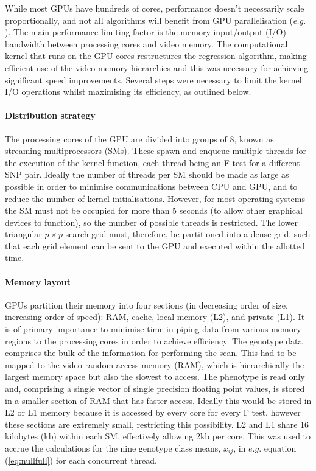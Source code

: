 While most GPUs have hundreds of cores, performance doesn't necessarily scale proportionally, and not all algorithms will benefit from GPU parallelisation (\emph{e.g.} \citealp{Davis2011}). The main performance limiting factor is the memory input/output (I/O) bandwidth between processing cores and video memory. The computational kernel that runs on the GPU cores restructures the regression algorithm, making efficient use of the video memory hierarchies and this was necessary for achieving significant speed improvements. Several steps were necessary to limit the kernel I/O operations whilst maximising its efficiency, as outlined below.

\paragraph{Distribution strategy} The processing cores of the GPU are divided into groups of 8, known as streaming multiprocessors (SMs). These spawn and enqueue multiple threads for the execution of the kernel function, each thread being an F test for a different SNP pair. Ideally the number of threads per SM should be made as large as possible in order to minimise communications between CPU and GPU, and to reduce the number of kernel initialisations. However, for most operating systems the SM must not be occupied for more than 5 seconds (to allow other graphical devices to function), so the number of possible threads is restricted. The lower triangular $p \times p$ search grid must, therefore, be partitioned into a dense grid, such that each grid element can be sent to the GPU and executed within the allotted time.

\paragraph{Memory layout} GPUs partition their memory into four sections (in decreasing order of size, increasing order of speed): RAM, cache, local memory (L2), and private (L1). It is of primary importance to minimise time in piping data from various memory regions to the processing cores in order to achieve efficiency. The genotype data comprises the bulk of the information for performing the scan. This had to be mapped to the video random access memory (RAM), which is hierarchically the largest memory space but also the slowest to access. The phenotype is read only and, comprising a single vector of single precision floating point values, is stored in a smaller section of RAM that has faster access. Ideally this would be stored in L2 or L1 memory because it is accessed by every core for every F test, however these sections are extremely small, restricting this possibility. L2 and L1 share 16 kilobytes (kb) within each SM, effectively allowing 2kb per core. This was used to accrue the calculations for the nine genotype class means, $x_{ij}$, in $e.g.$ equation (\ref{eq:nullfull}) for each concurrent thread.

